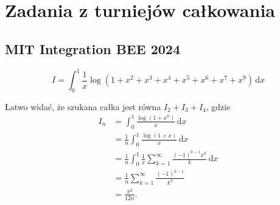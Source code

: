 %

\section{Zadania z turniejów całkowania}
\subsection{MIT Integration BEE 2024}

\begin{problem}
    \begin{equation}
        I = \int_0^1 \frac 1 x \log (1 + x^2 + x^3 + x^4 + x^5 + x^6 + x^7 + x^9) \,\mathrm{d}x
    \end{equation}
\end{problem}

\begin{solution}
    Łatwo widać, że szukana całka jest równa $I_2 + I_3 + I_4$, gdzie
    \begin{align}
        I_n & = \int_0^1 \frac {\log (1 + x^n)}{x} \,\mathrm{d}x \\
            & = \frac 1 n \int_0^1 \frac {\log (1 + x)}{x} \,\mathrm{d}x \\
            & = \frac 1 n \int_0^1 \frac 1 x \sum_{k=1}^\infty \frac{(-1)^{k-1}x^k}{k} \,\mathrm{d}x \\
            & = \frac 1 n \sum_{k=1}^\infty \frac{(-1)^{k-1}}{k^2} \\
            & = \frac {\pi^2}{12n}.
    \end{align}
\end{solution}


%